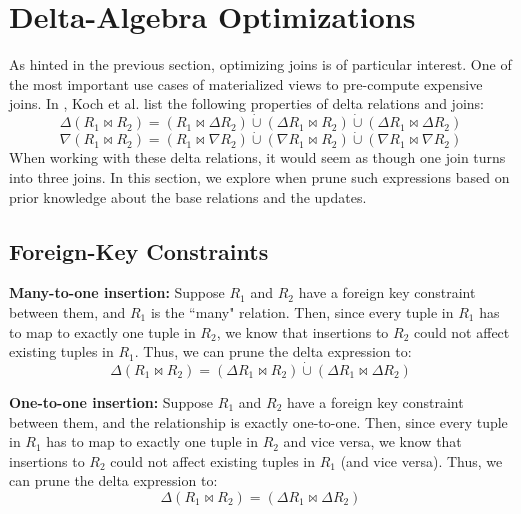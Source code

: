 \section{Delta-Algebra Optimizations}
As hinted in the previous section, optimizing joins is of particular interest. 
One of the most important use cases of materialized views to pre-compute expensive joins.
In \cite{DBLP:journals/vldb/KochAKNNLS14}, Koch et al. list the following properties of delta relations and joins:
\[ \Delta(R_1 \bowtie R_2) =  (R_1 \bowtie \Delta R_2) \dot{\cup} (\Delta R_1 \bowtie  R_2) \dot{\cup} (\Delta R_1 \bowtie  \Delta R_2)\]
\[ \nabla(R_1 \bowtie R_2) =  (R_1 \bowtie \nabla R_2) \dot{\cup} (\nabla R_1 \bowtie  R_2) \dot{\cup} (\nabla R_1 \bowtie  \nabla R_2)\]
When working with these delta relations, it would seem as though one join turns into three joins.
In this section, we explore when prune such expressions based on prior knowledge about the base relations and the updates.

\subsection{Foreign-Key Constraints}


\textbf{Many-to-one insertion: } Suppose $R_1$ and $R_2$ have a foreign key constraint between them, and $R_1$ is the ``many" relation. Then, since every tuple in $R_1$ has to map to exactly one tuple in $R_2$, we know that insertions to $R_2$ could not affect existing tuples in $R_1$. Thus, we can prune the delta expression to:
\[ \Delta(R_1 \bowtie R_2) =  (\Delta R_1 \bowtie  R_2) \dot{\cup} (\Delta R_1 \bowtie  \Delta R_2)\]

\textbf{One-to-one insertion: } Suppose $R_1$ and $R_2$ have a foreign key constraint between them, and the relationship is exactly one-to-one. Then, since every tuple in $R_1$ has to map to exactly one tuple in $R_2$ and vice versa, we know that insertions to $R_2$ could not affect existing tuples in $R_1$ (and vice versa). Thus, we can prune the delta expression to:
\[ \Delta(R_1 \bowtie R_2) =  (\Delta R_1 \bowtie  \Delta R_2)\]

